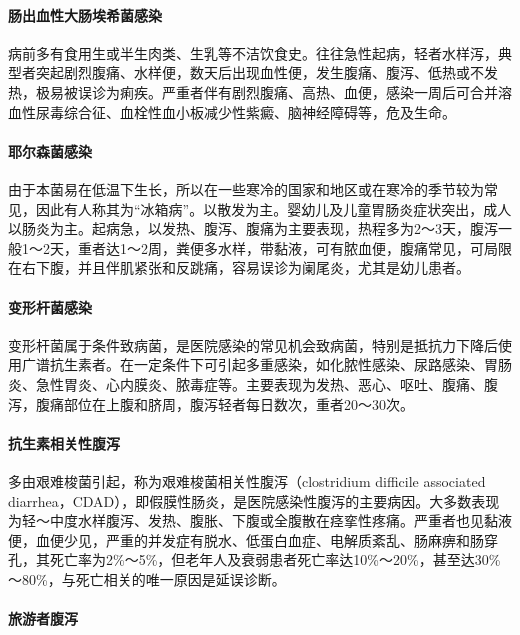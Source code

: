 \paragraph{肠出血性大肠埃希菌感染}

病前多有食用生或半生肉类、生乳等不洁饮食史。往往急性起病，轻者水样泻，典型者突起剧烈腹痛、水样便，数天后出现血性便，发生腹痛、腹泻、低热或不发热，极易被误诊为痢疾。严重者伴有剧烈腹痛、高热、血便，感染一周后可合并溶血性尿毒综合征、血栓性血小板减少性紫癜、脑神经障碍等，危及生命。

\paragraph{耶尔森菌感染}

由于本菌易在低温下生长，所以在一些寒冷的国家和地区或在寒冷的季节较为常见，因此有人称其为“冰箱病”。以散发为主。婴幼儿及儿童胃肠炎症状突出，成人以肠炎为主。起病急，以发热、腹泻、腹痛为主要表现，热程多为2～3天，腹泻一般1～2天，重者达1～2周，粪便多水样，带黏液，可有脓血便，腹痛常见，可局限在右下腹，并且伴肌紧张和反跳痛，容易误诊为阑尾炎，尤其是幼儿患者。

\paragraph{变形杆菌感染}

变形杆菌属于条件致病菌，是医院感染的常见机会致病菌，特别是抵抗力下降后使用广谱抗生素者。在一定条件下可引起多重感染，如化脓性感染、尿路感染、胃肠炎、急性胃炎、心内膜炎、脓毒症等。主要表现为发热、恶心、呕吐、腹痛、腹泻，腹痛部位在上腹和脐周，腹泻轻者每日数次，重者20～30次。

\paragraph{抗生素相关性腹泻}

多由艰难梭菌引起，称为艰难梭菌相关性腹泻（clostridium difficile
associated
diarrhea，CDAD），即假膜性肠炎，是医院感染性腹泻的主要病因。大多数表现为轻～中度水样腹泻、发热、腹胀、下腹或全腹散在痉挛性疼痛。严重者也见黏液便，血便少见，严重的并发症有脱水、低蛋白血症、电解质紊乱、肠麻痹和肠穿孔，其死亡率为2\%～5\%，但老年人及衰弱患者死亡率达10\%～20\%，甚至达30\%～80\%，与死亡相关的唯一原因是延误诊断。

\paragraph{旅游者腹泻}

